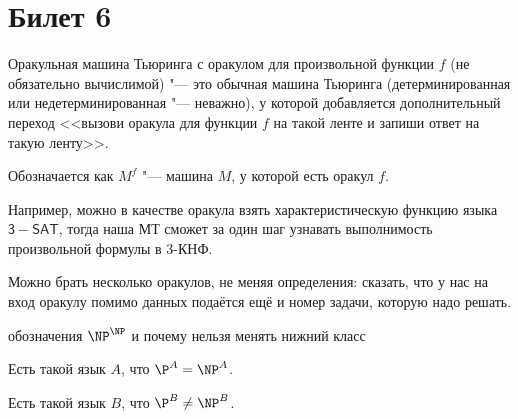 \setcounter{section}{5}
\section{Билет 6}
	\begin{Def}
		Оракульная машина Тьюринга с оракулом для произвольной функции $f$ (не обязательно вычислимой) "--- это обычная машина Тьюринга (детерминированная или недетерминированная "--- неважно),
		у которой добавляется дополнительный переход <<вызови оракула для функции $f$ на такой ленте и запиши ответ на такую ленту>>.

		Обозначается как $M^f$ "--- машина $M$, у которой есть оракул $f$.
	\end{Def}
	\begin{exmp}
		Например, можно в качестве оракула взять характеристическую функцию языка $\mathsf{3-SAT}$, тогда наша МТ сможет за один шаг узнавать выполнимость
		произвольной формулы в 3-КНФ.
	\end{exmp}
	\begin{Rem}
		Можно брать несколько оракулов, не меняя определения: сказать, что у нас на вход оракулу помимо данных подаётся ещё и номер задачи, которую надо решать.
	\end{Rem}

	\TODO обозначения $\NP^{\NP}$ и почему нельзя менять нижний класс

	\begin{theorem}
		Есть такой язык $A$, что $\P^A = \NP^A$.
	\end{theorem}

	\begin{theorem}
		Есть такой язык $B$, что $\P^B \neq \NP^B$.
	\end{theorem}
